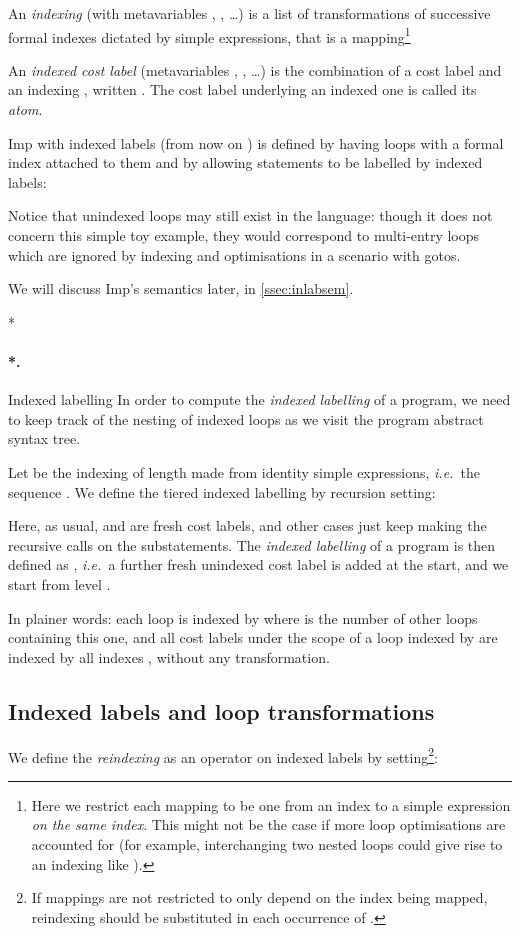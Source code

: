 \documentclass[submission,copyright,creativecommons]{eptcs}
\makeatletter
\theoremstyle{definition}
\newcommand{\imp}{{\sf Imp}}            \newcommand{\vm}{{\sf Vm}}              \newcommand{\mips}{{\sf Mips}}          \newcommand{\Clight}{{\sf Clight}}        \newcommand{\Cminor}{{\sf Cminor}}
\newcommand{\ie}{\emph{i.e.\ }}
\let\oldparagraph\paragraph
\def\paragraph{\@ifnextchar*\new@paragraph@star\new@paragraph}
\def\new@paragraph@star*#1{\oldparagraph*{#1.}}
\def\new@paragraph#1{\oldparagraph{#1.}}
\makeatother
\begin{document}
An \emph{indexing} (with metavariables , , \ldots) is a list of transformations of successive formal indexes dictated by simple expressions, that is a mapping\footnote{Here we restrict each mapping to be one from an index to a
    simple expression \emph{on the same index}. This might not be the case if more loop
    optimisations are accounted for (for example, interchanging two nested
    loops could give rise to an indexing like ).}


An \emph{indexed cost label} (metavariables , , \ldots) is the combination of a cost label  and an indexing , written .
The cost label underlying an indexed one is called its \emph{atom}.

\imp{} with indexed labels (from now on ) is defined by
having loops with a formal index attached to them and by allowing statements to
be labelled by indexed labels:

Notice that unindexed loops may still exist in the language: though it does not
concern this simple toy example, they would correspond to multi-entry loops which
are ignored by indexing and optimisations in a scenario with gotos.

We will discuss \imp{}'s semantics later, in \autoref{ssec:inlabsem}.

\paragraph*{Indexed labelling}
In order to compute the \emph{indexed labelling}  of a program, we
need to keep track of the nesting of indexed loops as we visit the program
abstract syntax tree.

Let  be the indexing of length  made from identity simple expressions,
\ie the sequence .
We define the tiered indexed labelling  by recursion setting:

Here, as usual,  and  are fresh cost labels, and other cases just keep making the recursive calls on the substatements.
The \emph{indexed labelling} of a program  is then defined as , \ie a further fresh unindexed cost label is added at the start, and we start from level .

In plainer words: each loop is indexed by  where  is the number of other loops containing this one, and all cost labels under the scope of a loop indexed by  are indexed by all indexes , without any transformation.

\subsection{Indexed labels and loop transformations}\label{ssec2}
We define the \emph{reindexing}  as an operator on indexed labels by setting\footnote{If mappings are not restricted to only depend on the index being mapped,
    reindexing should be substituted in each occurrence of .}:
\end{document}
